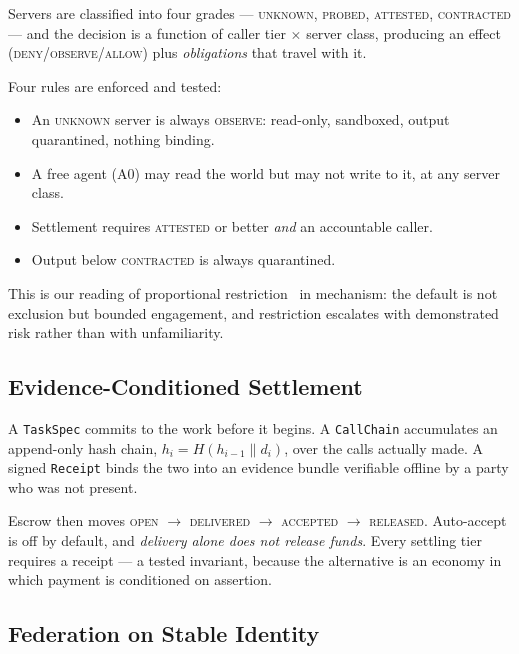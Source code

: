 \documentclass[11pt]{article}
\begin{document}
Servers are classified into four grades --- \textsc{unknown}, \textsc{probed},
\textsc{attested}, \textsc{contracted} --- and the decision is a function of
caller tier $\times$ server class, producing an effect
(\textsc{deny}/\textsc{observe}/\textsc{allow}) plus \emph{obligations} that
travel with it.

Four rules are enforced and tested:

\begin{itemize}[leftmargin=1.4em,itemsep=0.1em]
\item An \textsc{unknown} server is always \textsc{observe}: read-only,
      sandboxed, output quarantined, nothing binding.
\item A free agent (A0) may read the world but may not write to it, at any
      server class.
\item Settlement requires \textsc{attested} or better \emph{and} an accountable
      caller.
\item Output below \textsc{contracted} is always quarantined.
\end{itemize}

This is our reading of proportional restriction~\cite{pattison2026} in
mechanism: the default is not exclusion but bounded engagement, and restriction
escalates with demonstrated risk rather than with unfamiliarity.

\subsection{Evidence-Conditioned Settlement}\label{sec:receipts}

A \texttt{TaskSpec} commits to the work before it begins. A \texttt{CallChain}
accumulates an append-only hash chain, $h_i = H(h_{i-1} \| d_i)$, over the calls
actually made. A signed \texttt{Receipt} binds the two into an evidence bundle
verifiable offline by a party who was not present.

Escrow then moves \textsc{open} $\rightarrow$ \textsc{delivered} $\rightarrow$
\textsc{accepted} $\rightarrow$ \textsc{released}. Auto-accept is off by default,
and \emph{delivery alone does not release funds}. Every settling tier requires a
receipt --- a tested invariant, because the alternative is an economy in which
payment is conditioned on assertion.

\subsection{Federation on Stable Identity}\label{sec:federation}
\end{document}
